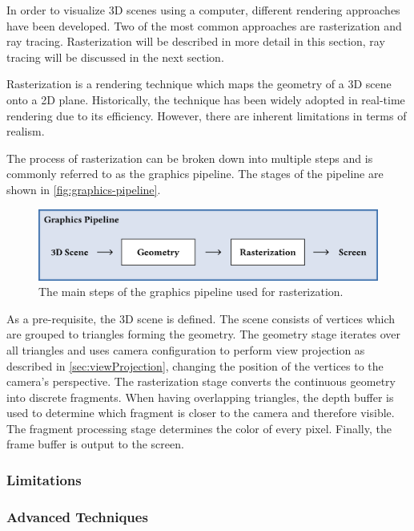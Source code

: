 In order to visualize 3D scenes using a computer, different rendering approaches have been developed. Two of the most common approaches are rasterization and ray tracing. Rasterization will be described in more detail in this section, ray tracing will be discussed in the next section.

Rasterization is a rendering technique which maps the geometry of a 3D scene onto a 2D plane. Historically, the technique has been widely adopted in real-time rendering due to its efficiency. However, there are inherent limitations in terms of realism.

The process of rasterization can be broken down into multiple steps and is commonly referred to as the graphics pipeline. The stages of the pipeline are shown in \autoref{fig:graphics-pipeline}.

\begin{figure}[H]
  \includegraphics[width=\columnwidth]{resources/graphics-pipeline.png}
  \caption{The main steps of the graphics pipeline used for rasterization.}
  \label{fig:graphics-pipeline}
\end{figure}

As a pre-requisite, the 3D scene is defined. The scene consists of vertices which are grouped to triangles forming the geometry. The geometry stage iterates over all triangles and uses camera configuration to perform view projection as described in \autoref{sec:viewProjection}, changing the position of the vertices to the camera's perspective. The rasterization stage converts the continuous geometry into discrete fragments. When having overlapping triangles, the depth buffer is used to determine which fragment is closer to the camera and therefore visible. The fragment processing stage determines the color of every pixel. Finally, the frame buffer is output to the screen.

\subsubsection{Limitations}

\subsubsection{Advanced Techniques}

